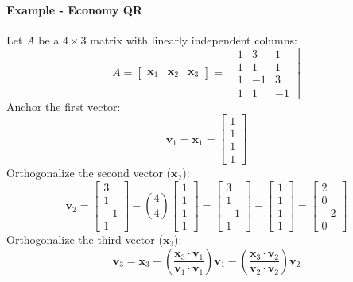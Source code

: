 \documentclass[../linear-algebra.tex]{subfiles}
\begin{document}
\paragraph{Example - Economy QR} Let $A$ be a $4 \times 3$ matrix with linearly independent columns:
$$A = \begin{bmatrix} \mathbf{x}_1 & \mathbf{x}_2 & \mathbf{x}_3 \end{bmatrix} = \begin{bmatrix} 1 & 3 & 1 \\ 1 & 1 & 1 \\ 1 & -1 & 3 \\ 1 & 1 & -1 \end{bmatrix}$$
Anchor the first vector:
$$\mathbf{v}_1 = \mathbf{x}_1 = \begin{bmatrix} 1 \\ 1 \\ 1 \\ 1 \end{bmatrix}$$
Orthogonalize the second vector ($\mathbf{x}_2$):
$$\mathbf{v}_2 = \begin{bmatrix} 3 \\ 1 \\ -1 \\ 1 \end{bmatrix} - \left( \frac{4}{4} \right) \begin{bmatrix} 1 \\ 1 \\ 1 \\ 1 \end{bmatrix} = \begin{bmatrix} 3 \\ 1 \\ -1 \\ 1 \end{bmatrix} - \begin{bmatrix} 1 \\ 1 \\ 1 \\ 1 \end{bmatrix} = \begin{bmatrix} 2 \\ 0 \\ -2 \\ 0 \end{bmatrix}$$
Orthogonalize the third vector ($\mathbf{x}_3$):
$$\mathbf{v}_3 = \mathbf{x}_3 - \left( \frac{\mathbf{x}_3 \cdot \mathbf{v}_1}{\mathbf{v}_1 \cdot \mathbf{v}_1} \right) \mathbf{v}_1 - \left( \frac{\mathbf{x}_3 \cdot \mathbf{v}_2}{\mathbf{v}_2 \cdot \mathbf{v}_2} \right) \mathbf{v}_2$$
\end{document}
